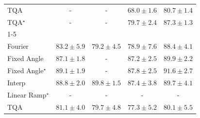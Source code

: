 \begin{tabular}{l|cccc|}
TQA & {\cellcolor[HTML]{000000}} \color[HTML]{F1F1F1} {\cellcolor{white}} \color{black} - & {\cellcolor[HTML]{000000}} \color[HTML]{F1F1F1} {\cellcolor{white}} \color{black} - & {\cellcolor[HTML]{FFFFE5}} \color[HTML]{000000} $68.0\pm 1.6$ & {\cellcolor[HTML]{68BE71}} \color[HTML]{000000} $80.7\pm 1.4$ \\
TQA$^\star$ & {\cellcolor[HTML]{000000}} \color[HTML]{F1F1F1} {\cellcolor{white}} \color{black} - & {\cellcolor[HTML]{000000}} \color[HTML]{F1F1F1} {\cellcolor{white}} \color{black} - & {\cellcolor[HTML]{7AC77A}} \color[HTML]{000000} $79.7\pm 2.4$ & {\cellcolor[HTML]{10743C}} \color[HTML]{F1F1F1} $87.3\pm 1.3$ \\
\cline{1-5}
\multicolumn{5}{c}{\rule{0pt}{8pt}SV} \\
\midrule
Fourier & {\cellcolor[HTML]{2F8BBE}} \color[HTML]{F1F1F1} $83.2\pm 5.9$ & {\cellcolor[HTML]{7EADD1}} \color[HTML]{F1F1F1} $79.2\pm 4.5$ & {\cellcolor[HTML]{83AFD3}} \color[HTML]{F1F1F1} $78.9\pm 7.6$ & {\cellcolor[HTML]{045B8F}} \color[HTML]{F1F1F1} $88.4\pm 4.1$ \\
Fixed Angle & {\cellcolor[HTML]{05659F}} \color[HTML]{F1F1F1} $87.1\pm 1.8$ & {\cellcolor[HTML]{000000}} \color[HTML]{F1F1F1} {\cellcolor{white}} \color{black} - & {\cellcolor[HTML]{04649E}} \color[HTML]{F1F1F1} $87.2\pm 2.5$ & {\cellcolor[HTML]{034B76}} \color[HTML]{F1F1F1} $89.9\pm 2.2$ \\
Fixed Angle$^\star$ & {\cellcolor[HTML]{045585}} \color[HTML]{F1F1F1} $89.1\pm 1.9$ & {\cellcolor[HTML]{000000}} \color[HTML]{F1F1F1} {\cellcolor{white}} \color{black} - & {\cellcolor[HTML]{046097}} \color[HTML]{F1F1F1} $87.8\pm 2.5$ & {\cellcolor[HTML]{023858}} \color[HTML]{F1F1F1} $91.6\pm 2.7$ \\
Interp & {\cellcolor[HTML]{04588A}} \color[HTML]{F1F1F1} $88.8\pm 2.0$ & {\cellcolor[HTML]{034C78}} \color[HTML]{F1F1F1} $89.8\pm 1.5$ & {\cellcolor[HTML]{04639B}} \color[HTML]{F1F1F1} $87.4\pm 3.8$ & {\cellcolor[HTML]{034D79}} \color[HTML]{F1F1F1} $89.7\pm 4.1$ \\
Linear Ramp$^\star$ & {\cellcolor[HTML]{000000}} \color[HTML]{F1F1F1} {\cellcolor{white}} \color{black} - & {\cellcolor[HTML]{000000}} \color[HTML]{F1F1F1} {\cellcolor{white}} \color{black} - & {\cellcolor[HTML]{000000}} \color[HTML]{F1F1F1} {\cellcolor{white}} \color{black} - & {\cellcolor[HTML]{000000}} \color[HTML]{F1F1F1} {\cellcolor{white}} \color{black} - \\
TQA & {\cellcolor[HTML]{589EC8}} \color[HTML]{F1F1F1} $81.1\pm 4.0$ & {\cellcolor[HTML]{76AAD0}} \color[HTML]{F1F1F1} $79.7\pm 4.8$ & {\cellcolor[HTML]{9FBAD9}} \color[HTML]{000000} $77.3\pm 5.2$ & {\cellcolor[HTML]{6DA6CD}} \color[HTML]{F1F1F1} $80.1\pm 5.5$ \\

\end{tabular}
